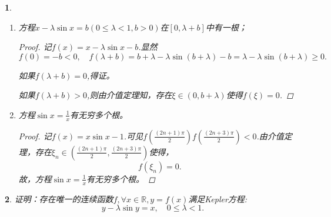 \documentclass[utf8]{book}
\newtheorem{example}{}[section]             %
\begin{document}
\begin{example}
\begin{enumerate}
\begin{proof}
当$x > 0$时， $x-\lambda\sin{x} \geq x -\lambda x = (1-\lambda) x  > 0$.

当$x < 0$时，
$x-\lambda\sin{x} \leq x -\lambda x = (1-\lambda) x < 0$. 

所以，方程$x-\lambda\sin{x}=0$只有唯一根$x=0$.
\end{proof}
\item 方程$x -\lambda\sin{x} = b(0\leq \lambda < 1, b > 0)$在$[0,\lambda + b]$中有一根；
\begin{proof}记$f(x) = x -\lambda\sin{x} - b$.显然
$$f(0) = -b < 0, \quad f(\lambda+b) = b+\lambda -\lambda\sin{(b+\lambda)} - b = \lambda -\lambda\sin{(b+\lambda)} \geq 0.$$

如果$f(\lambda+b) = 0$,得证。

如果$f(\lambda+b) > 0$,则由介值定理知，存在$\xi\in(0, b+\lambda)$使得$f(\xi) = 0$.
\end{proof}
\item 方程$\sin{x}=\displaystyle\frac{1}{x}$有无穷多个根。
\begin{proof}
记$f(x) = x\sin{x} - 1$.可见$f\left(\displaystyle\frac{(2n+1)\pi}{2}\right)f\left(\displaystyle\frac{(2n+3)\pi}{2}\right) < 0$.由介值定理，存在$\xi_n\in\left(\displaystyle\frac{(2n+1)\pi}{2},\displaystyle\frac{(2n+3)\pi}{2}\right)$使得，
$$f(\xi_n)=0.$$
故，方程$\sin{x}=\displaystyle\frac{1}{x}$有无穷多个根。
\end{proof}
\end{enumerate}
\end{example}
\begin{example}
证明：存在唯一的连续函数$f,\forall x\in\mathbb{R}, y=f(x)$满足Kepler方程:$$y-\lambda\sin{y}=x, \quad 0\leq\lambda < 1.$$
\end{example}
\end{document}
